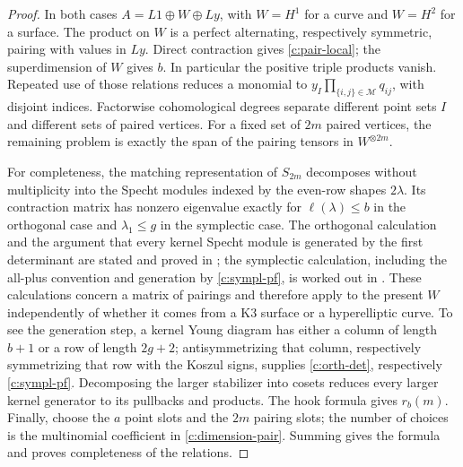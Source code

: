 \begin{proof}
In both cases $A=L1\oplus W\oplus Ly$, with $W=H^1$ for a curve and $W=H^2$ for a surface. The product on $W$ is a perfect alternating, respectively symmetric, pairing with values in $Ly$. Direct contraction gives \eqref{c:pair-local}; the superdimension of $W$ gives $b$. In particular the positive triple products vanish. Repeated use of those relations reduces a monomial to $y_I\prod_{\{i,j\}\in\mathcal M}q_{ij}$, with disjoint indices. Factorwise cohomological degrees separate different point sets $I$ and different sets of paired vertices. For a fixed set of $2m$ paired vertices, the remaining problem is exactly the span of the pairing tensors in $W^{\otimes2m}$.

For completeness, the matching representation of $S_{2m}$ decomposes without multiplicity into the Specht modules indexed by the even-row shapes $2\lambda$. Its contraction matrix has nonzero eigenvalue exactly for $\ell(\lambda)\leq b$ in the orthogonal case and $\lambda_1\leq g$ in the symplectic case. The orthogonal calculation and the argument that every kernel Specht module is generated by the first determinant are stated and proved in \citet[Proposition 3.5 and \S3.6, pp.~508--510]{c_yin2015}; the symplectic calculation, including the all-plus convention and generation by \eqref{c:sympl-pf}, is worked out in \citet[\S6, equation (2), and the argument preceding Corollary 6.4]{c_tavakol2018}. These calculations concern a matrix of pairings and therefore apply to the present $W$ independently of whether it comes from a K3 surface or a hyperelliptic curve. To see the generation step, a kernel Young diagram has either a column of length $b+1$ or a row of length $2g+2$; antisymmetrizing that column, respectively symmetrizing that row with the Koszul signs, supplies \eqref{c:orth-det}, respectively \eqref{c:sympl-pf}. Decomposing the larger stabilizer into cosets reduces every larger kernel generator to its pullbacks and products. The hook formula gives $r_b(m)$. Finally, choose the $a$ point slots and the $2m$ pairing slots; the number of choices is the multinomial coefficient in \eqref{c:dimension-pair}. Summing gives the formula and proves completeness of the relations.
\end{proof}

